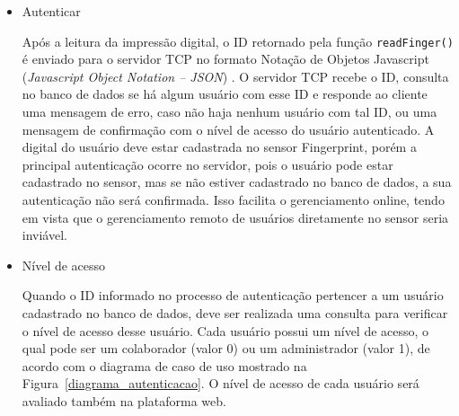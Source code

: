 \begin{itemize}
      \item Autenticar
      
      Após a leitura da impressão digital, o ID retornado pela função \verb!readFinger()! é enviado para o servidor TCP no formato Notação de Objetos Javascript (\textit{Javascript Object Notation -- JSON})  \cite{bassett2015introduction, smith2015beginning}. O servidor TCP recebe o ID, consulta no banco de dados se há algum usuário com esse ID e responde ao cliente uma mensagem de erro, caso não haja nenhum usuário com tal ID, ou uma mensagem de confirmação com o nível de acesso do usuário autenticado. A digital do usuário deve estar cadastrada no sensor Fingerprint, porém a principal autenticação ocorre no servidor, pois o usuário pode estar cadastrado no sensor, mas se não estiver cadastrado no banco de dados, a sua autenticação não será confirmada. Isso facilita o gerenciamento online, tendo em vista que o gerenciamento remoto de usuários diretamente no sensor seria inviável.
      
      
      
      \item Nível de acesso
      
      Quando o ID informado no processo de autenticação pertencer a um usuário cadastrado no banco de dados, deve ser realizada uma consulta para verificar o nível de acesso desse usuário. Cada usuário possui um nível de acesso, o qual pode ser um colaborador (valor 0) ou um administrador (valor 1), de acordo com o diagrama de caso de uso mostrado na Figura~\ref{diagrama_autenticacao}. O nível de acesso de cada usuário será avaliado também na plataforma web.
      

\end{itemize}
